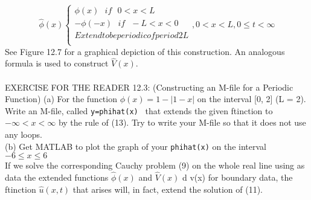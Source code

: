 \documentclass[../main.tex]{subfiles}
\begin{document}
\begin{equation}
\hat{\phi}(x)
	\begin{cases} 
\phi (x)   ~~~ if~~~ 0< x< L\\
-\phi (-x) ~~~ if ~~~ -L < x <0\\
Extend to be periodic of period 2L\\
\end{cases}		
,0 < x < L, 0\leqslant t  < \infty	
\end{equation}
See Figure 12.7 for a graphical depiction of this construction. An analogous
formula is used to construct $\hat{V}(x)$.\\
\\
EXERCISE FOR THE READER 12.3: (Constructing an M-file for a Periodic
Function) (a) For the function $\phi(x) = 1-|1-x|$ on the interval [0, 2] (L = 2).
Write an M-file, called \texttt{y=phihat(x) } that extends the given ftinction to $-\infty < x<\infty$  by the rule of (13). Try to write your M-file so that it does not use
any loops.
\\
(b) Get MATLAB to plot the graph of your \texttt{phihat(x)} on the interval  $-6\leqslant x \leqslant 6$\\

If we solve the corresponding Cauchy problem (9) on the whole real line using as
data the extended functions $\hat{\phi}(x)$ and $\hat{V}(x)$ d v(x) for boundary data, the ftinction $\hat{u}(x,t)$ that arises will, in fact, extend the solution of (11). 
\end{document}
